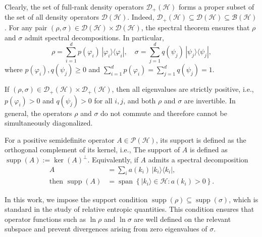 \documentclass[a4paper, amsfonts, amssymb, amsmath, reprint, showkeys, nofootinbib, twoside, aps, pra]{revtex4-2}
\theoremstyle{definition}
\begin{document}
Clearly, the set of full-rank density operators $\mathcal D_+(\mathcal H)$ 
forms a proper subset of the set of all density operators $\mathcal D(\mathcal H)$. 
Indeed, $\mathcal D_+(\mathcal H)\subseteq \mathcal D(\mathcal H)\subseteq \mathcal B(\mathcal H)$. For any pair $(\rho,\sigma)\in \mathcal{D}(\mathcal{H}) \times \mathcal{D}(\mathcal{H})$,
the spectral theorem ensures that $\rho$ and $\sigma$ admit spectral decompositions.
In particular,
\begin{equation}\label{rho}
    \rho = \sum_{i=1}^d p(\varphi_i)\, |\varphi_i \rangle \langle \varphi_i |, \quad
    \sigma = \sum_{j=1}^d q(\psi_j)\, |\psi_j \rangle \langle \psi_j |,
\end{equation}
where $p(\varphi_i), q(\psi_j) \ge 0$ and $\sum_{i=1}^d p(\varphi_i) = \sum_{j=1}^d q(\psi_j) = 1$.

If $(\rho,\sigma)\in \mathcal{D}_+(\mathcal{H})\times\mathcal{D}_+(\mathcal{H})$,
then all eigenvalues are strictly positive, i.e.,
$p(\varphi_i)>0$ and $q(\psi_j)>0$ for all $i,j$, and both $\rho$ and $\sigma$ are invertible. In general, the operators $\rho$ and $\sigma$ do not commute and therefore cannot be simultaneously diagonalized. 

For a positive semidefinite operator $A \in \mathcal P(\mathcal H)$, its support is defined as the orthogonal complement of its kernel, i.e.,
The support of $A$ is defined as $\operatorname{supp}(A) := \ker(A)^{\perp}$. Equivalently, if $A$ admits a spectral decomposition
\begin{align}
    A &= \sum_i a(k_i) \, |k_i\rangle\langle k_i|, \\
    \text{then } \operatorname{supp}(A) &= \operatorname{span}\left\{ |k_i\rangle \in \mathcal{H} : a(k_i) > 0 \right\}.
\end{align}

In this work, we impose the support condition $\operatorname{supp}(\rho) \subseteq \operatorname{supp}(\sigma)$, which is standard in the study of relative entropic quantities. This condition ensures that operator functions such as $\ln\rho$ and $\ln\sigma$
are well defined on the relevant subspace and prevent divergences arising from zero eigenvalues of $\sigma$.
\end{document}
